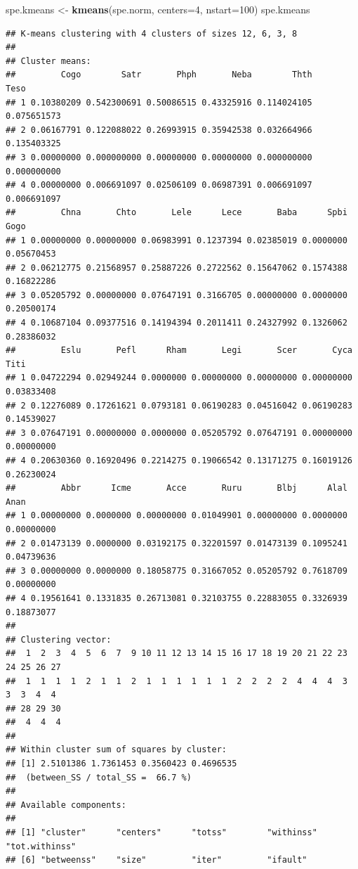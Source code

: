 \documentclass[
]{book}
\newenvironment{Shaded}{\begin{snugshade}}{\end{snugshade}}
\newcommand{\DataTypeTok}[1]{\textcolor[rgb]{0.13,0.29,0.53}{#1}}
\newcommand{\DecValTok}[1]{\textcolor[rgb]{0.00,0.00,0.81}{#1}}
\newcommand{\KeywordTok}[1]{\textcolor[rgb]{0.13,0.29,0.53}{\textbf{#1}}}
\newcommand{\NormalTok}[1]{#1}
\newcommand{\StringTok}[1]{\textcolor[rgb]{0.31,0.60,0.02}{#1}}
\begin{document}
\begin{Shaded}
\begin{Highlighting}[]
\NormalTok{spe.kmeans <-}\StringTok{ }\KeywordTok{kmeans}\NormalTok{(spe.norm, }\DataTypeTok{centers=}\DecValTok{4}\NormalTok{, }\DataTypeTok{nstart=}\DecValTok{100}\NormalTok{)}
\NormalTok{spe.kmeans}
\end{Highlighting}
\end{Shaded}

\begin{verbatim}
## K-means clustering with 4 clusters of sizes 12, 6, 3, 8
## 
## Cluster means:
##         Cogo        Satr       Phph       Neba        Thth        Teso
## 1 0.10380209 0.542300691 0.50086515 0.43325916 0.114024105 0.075651573
## 2 0.06167791 0.122088022 0.26993915 0.35942538 0.032664966 0.135403325
## 3 0.00000000 0.000000000 0.00000000 0.00000000 0.000000000 0.000000000
## 4 0.00000000 0.006691097 0.02506109 0.06987391 0.006691097 0.006691097
##         Chna       Chto       Lele      Lece       Baba      Spbi       Gogo
## 1 0.00000000 0.00000000 0.06983991 0.1237394 0.02385019 0.0000000 0.05670453
## 2 0.06212775 0.21568957 0.25887226 0.2722562 0.15647062 0.1574388 0.16822286
## 3 0.05205792 0.00000000 0.07647191 0.3166705 0.00000000 0.0000000 0.20500174
## 4 0.10687104 0.09377516 0.14194394 0.2011411 0.24327992 0.1326062 0.28386032
##         Eslu       Pefl      Rham       Legi       Scer       Cyca       Titi
## 1 0.04722294 0.02949244 0.0000000 0.00000000 0.00000000 0.00000000 0.03833408
## 2 0.12276089 0.17261621 0.0793181 0.06190283 0.04516042 0.06190283 0.14539027
## 3 0.07647191 0.00000000 0.0000000 0.05205792 0.07647191 0.00000000 0.00000000
## 4 0.20630360 0.16920496 0.2214275 0.19066542 0.13171275 0.16019126 0.26230024
##         Abbr      Icme       Acce       Ruru       Blbj      Alal       Anan
## 1 0.00000000 0.0000000 0.00000000 0.01049901 0.00000000 0.0000000 0.00000000
## 2 0.01473139 0.0000000 0.03192175 0.32201597 0.01473139 0.1095241 0.04739636
## 3 0.00000000 0.0000000 0.18058775 0.31667052 0.05205792 0.7618709 0.00000000
## 4 0.19561641 0.1331835 0.26713081 0.32103755 0.22883055 0.3326939 0.18873077
## 
## Clustering vector:
##  1  2  3  4  5  6  7  9 10 11 12 13 14 15 16 17 18 19 20 21 22 23 24 25 26 27 
##  1  1  1  1  2  1  1  2  1  1  1  1  1  1  2  2  2  2  4  4  4  3  3  3  4  4 
## 28 29 30 
##  4  4  4 
## 
## Within cluster sum of squares by cluster:
## [1] 2.5101386 1.7361453 0.3560423 0.4696535
##  (between_SS / total_SS =  66.7 %)
## 
## Available components:
## 
## [1] "cluster"      "centers"      "totss"        "withinss"     "tot.withinss"
## [6] "betweenss"    "size"         "iter"         "ifault"
\end{verbatim}
\end{document}
